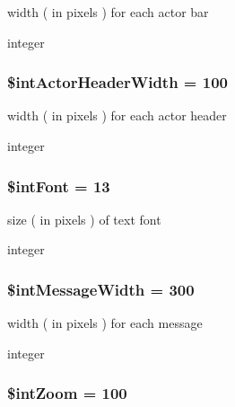 width ( in pixels ) for each actor bar

integer \hypertarget{class_xml_sequence_printer_diagram_61569050eaee6df3ed706f6f41c99f67}{
\subsubsection[{\$intActorHeaderWidth}]{\setlength{\rightskip}{0pt plus 5cm}\$intActorHeaderWidth = 100}}
\label{class_xml_sequence_printer_diagram_61569050eaee6df3ed706f6f41c99f67}


width ( in pixels ) for each actor header

integer \hypertarget{class_xml_sequence_printer_diagram_0ac1397d841f92d6140ea863c0eb2171}{
\subsubsection[{\$intFont}]{\setlength{\rightskip}{0pt plus 5cm}\$intFont = 13}}
\label{class_xml_sequence_printer_diagram_0ac1397d841f92d6140ea863c0eb2171}


size ( in pixels ) of text font

integer \hypertarget{class_xml_sequence_printer_diagram_f4e5f808b32b93258056fa0c4437d470}{
\subsubsection[{\$intMessageWidth}]{\setlength{\rightskip}{0pt plus 5cm}\$intMessageWidth = 300}}
\label{class_xml_sequence_printer_diagram_f4e5f808b32b93258056fa0c4437d470}


width ( in pixels ) for each message

integer \hypertarget{class_xml_sequence_printer_diagram_ba837fb08baf5fbca04d8237a589e93e}{
\subsubsection[{\$intZoom}]{\setlength{\rightskip}{0pt plus 5cm}\$intZoom = 100}}
\label{class_xml_sequence_printer_diagram_ba837fb08baf5fbca04d8237a589e93e}


